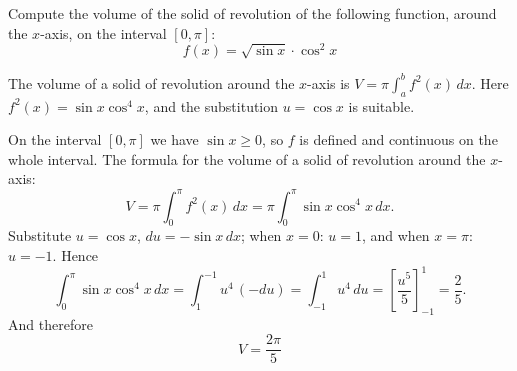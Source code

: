 
\begin{question}
Compute the volume of the solid of revolution of the following function, around the $x$-axis, on the interval $[0,\pi]$:
\[ f(x)=\sqrt{\sin x}\cdot\cos^2x \]
\end{question}

\begin{hint}
The volume of a solid of revolution around the $x$-axis is $V=\pi\int_a^b f^2(x)\,dx$. Here $f^2(x)=\sin x\cos^4x$, and the substitution $u=\cos x$ is suitable.
\end{hint}

\begin{solution}
On the interval $[0,\pi]$ we have $\sin x\ge0$, so $f$ is defined and continuous on the whole interval. The formula for the volume of a solid of revolution around the $x$-axis:
\[ V=\pi\int_0^{\pi}f^2(x)\,dx=\pi\int_0^{\pi}\sin x\cos^4x\,dx. \]
Substitute $u=\cos x$, $du=-\sin x\,dx$; when $x=0$: $u=1$, and when $x=\pi$: $u=-1$. Hence
\[ \int_0^{\pi}\sin x\cos^4x\,dx=\int_{1}^{-1}u^4\,(-du)=\int_{-1}^{1}u^4\,du=\left[\frac{u^5}{5}\right]_{-1}^{1}=\frac25. \]
And therefore
\[ \boxed{V=\frac{2\pi}{5}} \]
\end{solution}
